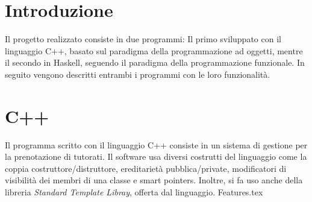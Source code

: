 \documentclass[
	a4paper,
	cleardoublepage=empty,
	headings=twolinechapter,
	numbers=autoenddot,
]{scrbook}
\begin{document}
	\frontmatter
	
	\begin{frontespizio}
		\Margini{3cm}{3cm}{3cm}{3cm}
		\Punteggiatura{}
		\begin{Preambolo*}
			\usepackage[italian]{babel}
			\usepackage[T1]{fontenc}
			\usepackage[utf8]{inputenc}
			\usepackage{microtype}
			\usepackage{lmodern}
			\graphicspath{{img/}}
			
			\renewcommand{\frontinstitutionfont}{\fontsize{14}{17}\bfseries\scshape}
			\renewcommand{\fronttitlefont}{\fontsize{17}{21}\bfseries\scshape}
			\renewcommand{\frontfootfont}{\fontsize{12}{14}\bfseries\scshape}
		\end{Preambolo*}
	\end{frontespizio}
	
	\tableofcontents
	\listoffigures
	\mainmatter
	
	\chapter*{Introduzione}
	Il progetto realizzato consiste in due programmi: Il primo sviluppato con il linguaggio C++, basato sul paradigma della programmazione ad oggetti, mentre il secondo in Haskell, seguendo il paradigma della programmazione funzionale. In seguito vengono descritti entrambi i programmi con le loro funzionalità.
	
	\chapter*{C++}
	Il programma scritto con il linguaggio C++ consiste in un sistema di gestione per la prenotazione di tutorati. Il software usa diversi costrutti del linguaggio come la coppia costruttore/distruttore, ereditarietà pubblica/private, modificatori di visibilità dei membri di una classe e smart pointers. Inoltre, si fa uso anche della libreria \textit{Standard Template Libray}, offerta dal linguaggio.
	{Features.tex}
	
\end{document}
